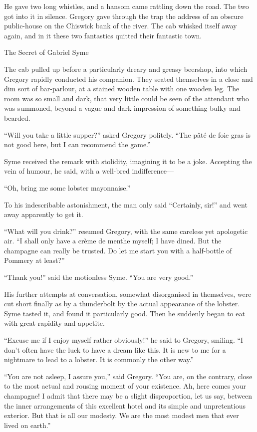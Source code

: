 He gave two long whistles, and a hansom came rattling down the road. The two got into it in silence. Gregory gave through the trap the address of an obscure public-house on the Chiswick bank of the river. The cab whisked itself away again, and in it these two fantastics quitted their fantastic town.

\chap The Secret of Gabriel Syme

The cab pulled up before a particularly dreary and greasy beershop, into which Gregory rapidly conducted his companion. They seated themselves in a close and dim sort of bar-parlour, at a stained wooden table with one wooden leg. The room was so small and dark, that very little could be seen of the attendant who was summoned, beyond a vague and dark impression of something bulky and bearded.

“Will you take a little supper?” asked Gregory politely. “The pâté de foie gras is not good here, but I can recommend the game.”

Syme received the remark with stolidity, imagining it to be a joke. Accepting the vein of humour, he said, with a well-bred indifference⁠—

“Oh, bring me some lobster mayonnaise.”

To his indescribable astonishment, the man only said “Certainly, sir!” and went away apparently to get it.

“What will you drink?” resumed Gregory, with the same careless yet apologetic air. “I shall only have a crème de menthe myself; I have dined. But the champagne can really be trusted. Do let me start you with a half-bottle of Pommery at least?”

“Thank you!” said the motionless Syme. “You are very good.”

His further attempts at conversation, somewhat disorganised in themselves, were cut short finally as by a thunderbolt by the actual appearance of the lobster. Syme tasted it, and found it particularly good. Then he suddenly began to eat with great rapidity and appetite.

“Excuse me if I enjoy myself rather obviously!” he said to Gregory, smiling. “I don’t often have the luck to have a dream like this. It is new to me for a nightmare to lead to a lobster. It is commonly the other way.”

“You are not asleep, I assure you,” said Gregory. “You are, on the contrary, close to the most actual and rousing moment of your existence. Ah, here comes your champagne! I admit that there may be a slight disproportion, let us say, between the inner arrangements of this excellent hotel and its simple and unpretentious exterior. But that is all our modesty. We are the most modest men that ever lived on earth.”

